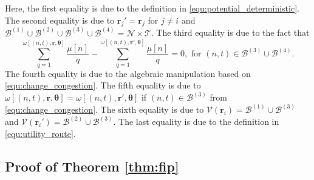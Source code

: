 \documentclass[journal]{IEEEtran}
\newcommand{\mc}[1]{\mathcal{#1}}
\newcommand{\bs}[1]{\boldsymbol{#1}}
\begin{document}
%
Here, the first equality is due to the definition in \eqref{equ:potential_deterministic}.
  The second equality is due to $\bs{r}_j' = \bs{r}_j$ for $j \neq i$ and $\mathcal{B}^{(1)} \cup \mathcal{B}^{(2)} \cup \mathcal{B}^{(3)} \cup \mathcal{B}^{(4)} = \mc{N} \times \mc{T}$.
  The third equality is due to the fact that
%
\begin{equation}
	 \sum_{q=1}^{\omega[(n,t), \boldsymbol{r}, \boldsymbol{\theta}]} \frac{\mu[n]}{q} - \sum_{q=1}^{\omega[(n,t), \boldsymbol{r}', \boldsymbol{\theta}]} \frac{\mu[n]}{q} = 0, \text{ for } (n,t) \in \mathcal{B}^{(3)} \cup \mathcal{B}^{(4)}.
\end{equation}
% 
  The fourth equality is due to the algebraic manipulation based on \eqref{equ:change_congestion}.
	The fifth equality is due to $\omega[(n,t), \boldsymbol{r}, \boldsymbol{\theta}] = \omega[(n,t), \boldsymbol{r}', \boldsymbol{\theta}]$ if $(n,t) \in \mc{B}^{(3)}$ from \eqref{equ:change_congestion}.
	The sixth equality is due to $\mc{V}(\bs{r}_i) = \mathcal{B}^{(1)} \cup \mathcal{B}^{(3)}$ and $\mc{V}(\bs{r}_i') = \mathcal{B}^{(2)} \cup \mathcal{B}^{(3)}$.
	The last equality is due to the definition in \eqref{equ:utility_route}.  \hfill \IEEEQED %


\subsection{Proof of Theorem \ref{thm:fip}} \label{app:fip}
\end{document}
